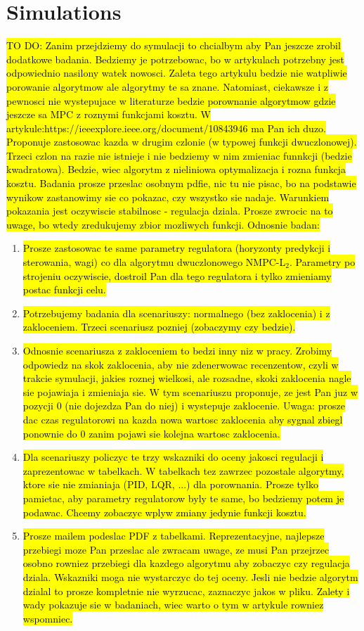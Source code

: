 \documentclass[twocolumn]{svjour3}
\begin{document}
\section{Simulations}
\label{sec:s}
\hl{TO DO: Zanim przejdziemy do symulacji to chcialbym aby Pan jeszcze zrobil dodatkowe badania. Bedziemy je potrzebowac, bo w artykulach potrzebny jest odpowiednio nasilony watek nowosci. Zaleta tego artykulu bedzie nie watpliwie porowanie algorytmow ale algorytmy te sa znane. Natomiast, ciekawsze i z pewnosci nie wystepujace w literaturze bedzie porownanie algorytmow gdzie jeszcze sa MPC z roznymi funkcjami kosztu. W artykule:https://ieeexplore.ieee.org/document/10843946 ma Pan ich duzo. Proponuje zastosowac kazda w drugim czlonie (w typowej funkcji dwuczlonowej). Trzeci czlon na razie nie istnieje i nie bedziemy w nim zmieniac funnkcji (bedzie kwadratowa). Bedzie, wiec algorytm z nieliniowa optymalizacja i rozna funkcja kosztu. Badania prosze przeslac osobnym pdfie, nic tu nie pisac, bo na podstawie wynikow zastanowimy sie co pokazac, czy wszystko sie nadaje. Warunkiem pokazania jest oczywiscie stabilnosc - regulacja dziala. Prosze zwrocic na to uwage, bo wtedy zredukujemy zbior mozliwych funkcji. Odnosnie badan:}
\begin{enumerate}
\item \hl{Prosze zastosowac te same parametry regulatora (horyzonty predykcji i sterowania, wagi) co dla algorytmu dwuczlonowego NMPC-L$_2$. Parametry po strojeniu oczywiscie, dostroil Pan dla tego regulatora i tylko zmieniamy postac funkcji celu.}
\item \hl{Potrzebujemy badania dla scenariuszy: normalnego (bez zaklocenia) i z zakloceniem. Trzeci scenariusz pozniej (zobaczymy czy bedzie). }
\item \hl{Odnosnie scenariusza z zakloceniem to bedzi inny niz w pracy. Zrobimy odpowiedz na skok zaklocenia, aby nie zdenerwowac recenzentow, czyli w trakcie symulacji, jakies roznej wielkosi, ale rozsadne, skoki zaklocenia nagle sie pojawiaja i zmieniaja sie. W tym scenariuszu proponuje, ze jest Pan juz w pozycji 0 (nie dojezdza Pan do niej) i wystepuje zaklocenie. Uwaga: prosze dac czas regulatorowi na kazda nowa wartosc zaklocenia aby sygnal zbiegl ponownie do 0 zanim pojawi sie kolejna wartosc zaklocenia.}
\item \hl{Dla scenariuszy policzyc te trzy wskazniki do oceny jakosci regulacji i zaprezentowac w tabelkach. W tabelkach tez zawrzec pozostale algorytmy, ktore sie nie zmianiaja (PID, LQR, ...) dla porownania. Prosze tylko pamietac, aby parametry regulatorow byly te same, bo bedziemy potem je podawac. Chcemy zobaczyc wplyw zmiany jedynie funkcji kosztu.}
\item \hl{Prosze mailem podeslac PDF z tabelkami. Reprezentacyjne, najlepsze przebiegi moze Pan przeslac ale zwracam uwage, ze musi Pan przejrzec osobno rowniez przebiegi dla kazdego algorytmu aby zobaczyc czy regulacja dziala. Wskazniki moga nie wystarczyc do tej oceny. Jesli nie bedzie algorytm dzialal to prosze kompletnie nie wyrzucac, zaznaczyc jakos w pliku. Zalety i wady pokazuje sie w badaniach, wiec warto o tym w artykule rowniez wspomniec.}
\end{enumerate}
\end{document}

